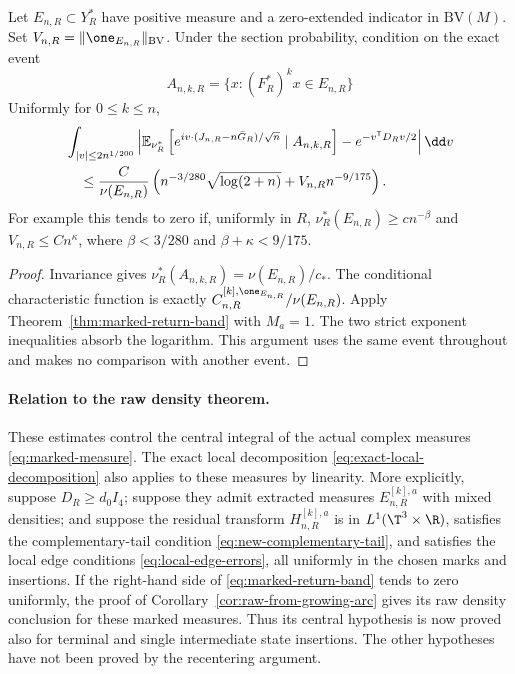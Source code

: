 \begin{corollary}
\label{cor:marked-state-conditioning}
Let $E_{n,R}\subset Y_R^*$ have positive measure and a zero-extended
indicator in $\mathrm{BV}(M)$. Set
$V_{n,R}=\|\one_{E_{n,R}}\|_{\mathrm{BV}}$. Under the section probability,
condition on the exact event
\[
 A_{n,k,R}=\{x:(F_R^*)^kx\in E_{n,R}\}
\]
Uniformly for $0\le k\le n$,
\begin{align}
 &\int_{|v|\le2n^{1/200}}
 \left|\mathbb E_{\nu_R^*}\left[
 e^{iv\cdot(J_{n,R}-n\bar G_R)/\sqrt n}\mid A_{n,k,R}\right]
          -e^{-v^{\mathsf T}D_Rv/2}\right|\dd v\notag\\
 &\quad\le\frac{C}{\nu(E_{n,R})}
  \left(n^{-3/280}\sqrt{\log(2+n)}+V_{n,R}n^{-9/175}\right).
       \label{eq:marked-conditional-band}
\end{align}
For example this tends to zero if, uniformly in $R$,
$\nu_R^*(E_{n,R})\ge c n^{-\beta}$ and $V_{n,R}\le Cn^\kappa$,
where $\beta<3/280$ and $\beta+\kappa<9/175$.
\end{corollary}
\begin{proof}
Invariance gives $\nu_R^*(A_{n,k,R})=\nu(E_{n,R})/c_*$.
The conditional characteristic function is exactly
$C^{[k],\one_{E_{n,R}}}_{n,R}/\nu(E_{n,R})$. Apply
Theorem~\ref{thm:marked-return-band} with $M_a=1$. The two strict
exponent inequalities absorb the logarithm. This argument uses the
same event throughout and makes no comparison with another event.
\end{proof}

\paragraph{Relation to the raw density theorem.}
These estimates control the central integral of the actual complex
measures \eqref{eq:marked-measure}. The exact local decomposition
\eqref{eq:exact-local-decomposition} also applies to these measures by
linearity. More explicitly, suppose $D_R\ge d_0 I_4$; suppose they admit
extracted measures $E^{[k],a}_{n,R}$ with mixed densities; and suppose
the residual transform $H^{[k],a}_{n,R}$ is in
$L^1(\T^3\times\R)$, satisfies the complementary-tail condition
\eqref{eq:new-complementary-tail}, and satisfies the local edge
conditions \eqref{eq:local-edge-errors}, all uniformly in the chosen
marks and insertions. If the right-hand side of
\eqref{eq:marked-return-band} tends to zero uniformly, the proof of
Corollary~\ref{cor:raw-from-growing-arc} gives its raw density conclusion
for these marked measures. Thus its central hypothesis is now proved
also for terminal and single intermediate state insertions. The other
hypotheses have not been proved by the recentering argument.


